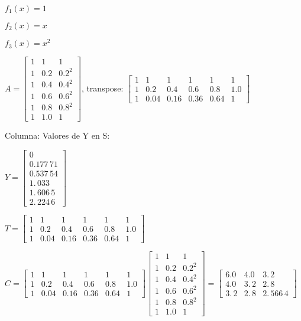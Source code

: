 \documentclass{article}
\begin{document}
$f_{1}(x)=1$

$f_{2}(x)=x$

$f_{3}(x)=x^{2}$

$A=\left[ 
\begin{array}{ccc}
1 & 1 & 1 \\ 
1 & 0.2 & 0.2^{2} \\ 
1 & 0.4 & 0.4^{2} \\ 
1 & 0.6 & 0.6^{2} \\ 
1 & 0.8 & 0.8^{2} \\ 
1 & 1.0 & 1%
\end{array}%
\right] $, transpose: $\left[ 
\begin{array}{cccccc}
1 & 1 & 1 & 1 & 1 & 1 \\ 
1 & 0.2 & 0.4 & 0.6 & 0.8 & 1.0 \\ 
1 & 0.04 & 0.16 & 0.36 & 0.64 & 1%
\end{array}%
\right] \allowbreak $

Columna: Valores de Y en S:

$Y=\left[ 
\begin{array}{c}
0 \\ 
0.177\,71 \\ 
\allowbreak \allowbreak \allowbreak 0.537\,54 \\ 
1.\,\allowbreak 033 \\ 
1.\,\allowbreak 606\,5 \\ 
\allowbreak \allowbreak 2.\,\allowbreak 224\,6%
\end{array}%
\right] $

$T=\left[ 
\begin{array}{cccccc}
1 & 1 & 1 & 1 & 1 & 1 \\ 
1 & 0.2 & 0.4 & 0.6 & 0.8 & 1.0 \\ 
1 & 0.04 & 0.16 & 0.36 & 0.64 & 1%
\end{array}%
\right] \allowbreak $

$C=\left[ 
\begin{array}{cccccc}
1 & 1 & 1 & 1 & 1 & 1 \\ 
1 & 0.2 & 0.4 & 0.6 & 0.8 & 1.0 \\ 
1 & 0.04 & 0.16 & 0.36 & 0.64 & 1%
\end{array}%
\right] \allowbreak \left[ 
\begin{array}{ccc}
1 & 1 & 1 \\ 
1 & 0.2 & 0.2^{2} \\ 
1 & 0.4 & 0.4^{2} \\ 
1 & 0.6 & 0.6^{2} \\ 
1 & 0.8 & 0.8^{2} \\ 
1 & 1.0 & 1%
\end{array}%
\right] =\allowbreak \left[ 
\begin{array}{ccc}
6.0 & 4.0 & 3.\,\allowbreak 2 \\ 
4.0 & 3.\,\allowbreak 2 & 2.\,\allowbreak 8 \\ 
3.\,\allowbreak 2 & 2.\,\allowbreak 8 & 2.\,\allowbreak 566\,4%
\end{array}%
\right] \allowbreak $
\end{document}
